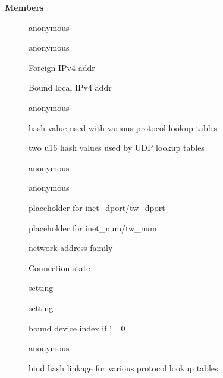 \documentclass[a4paper,8pt,english]{sphinxmanual}
\begin{document}
\textbf{Members}
\begin{description}
\item[{}] \leavevmode
anonymous

\item[{}] \leavevmode
anonymous

\item[{}] \leavevmode
Foreign IPv4 addr

\item[{}] \leavevmode
Bound local IPv4 addr

\item[{}] \leavevmode
anonymous

\item[{}] \leavevmode
hash value used with various protocol lookup tables

\item[{}] \leavevmode
two u16 hash values used by UDP lookup tables

\item[{}] \leavevmode
anonymous

\item[{}] \leavevmode
anonymous

\item[{}] \leavevmode
placeholder for inet\_dport/tw\_dport

\item[{}] \leavevmode
placeholder for inet\_num/tw\_num

\item[{}] \leavevmode
network address family

\item[{}] \leavevmode
Connection state

\item[{}] \leavevmode
{} setting

\item[{}] \leavevmode
{} setting

\item[{}] \leavevmode
bound device index if != 0

\item[{}] \leavevmode
anonymous

\item[{}] \leavevmode
bind hash linkage for various protocol lookup tables


\end{description}
\end{document}
